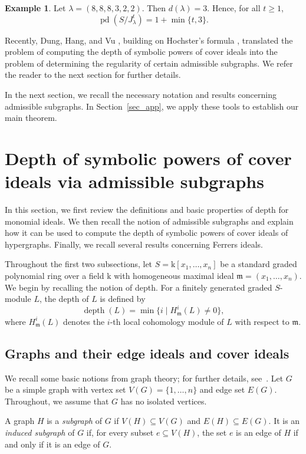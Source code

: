 \documentclass[12pt,amscd]{amsart}
\theoremstyle{definition}
\newtheorem{exam}[thm]{Example}
\numberwithin{equation}{section}
\DeclareMathOperator{\depth}{depth}
\DeclareMathOperator{\pd}{pd}
\def\m {\mathfrak m}
\def\k {\mathrm{k}}
\begin{document}
\begin{exam}
Let $\lambda = (8,8,8,3,2,2)$. Then $d(\lambda)=3$. Hence, for all $t \ge 1$,
\[
\pd(S/J_\lambda^t)=1+\min\{t,3\}.
\]
\end{exam}

Recently, Dung, Hang, and Vu \cite{DHV}, building on Hochster's formula \cite{Hoc}, translated the problem of computing the depth of symbolic powers of cover ideals into the problem of determining the regularity of certain admissible subgraphs. We refer the reader to the next section for further details.

In the next section, we recall the necessary notation and results concerning admissible subgraphs. In Section~\ref{sec_app}, we apply these tools to establish our main theorem.

\section{Depth of symbolic powers of cover ideals via admissible subgraphs}
In this section, we first review the definitions and basic properties of depth for monomial ideals. We then recall the notion of admissible subgraphs and explain how it can be used to compute the depth of symbolic powers of cover ideals of hypergraphs. Finally, we recall several results concerning Ferrers ideals.

Throughout the first two subsections, let
\( S = \k[x_1,\ldots, x_n]
\)
be a standard graded polynomial ring over a field $\k$ with homogeneous maximal ideal
\(
\m = (x_1,\ldots, x_n).
\)
We begin by recalling the notion of depth. For a finitely generated graded $S$-module $L$, the depth of $L$ is defined by
\[
\depth(L) = \min\{i \mid H_{\m}^i(L) \ne 0\},
\]
where $H^{i}_{\m}(L)$ denotes the $i$-th local cohomology module of $L$ with respect to $\m$.



\subsection{Graphs and their edge ideals and cover ideals} We recall some basic notions from graph theory; for further details, see~\cite{Di}. Let $G$ be a simple graph with vertex set $V(G) = \{1, \ldots, n\}$ and edge set $E(G)$. Throughout, we assume that $G$ has no isolated vertices.

A graph $H$ is a \emph{subgraph} of $G$ if $V(H) \subseteq V(G)$ and $E(H) \subseteq E(G)$. It is an \emph{induced subgraph} of $G$ if, for every subset $e \subseteq V(H)$, the set $e$ is an edge of $H$ if and only if it is an edge of $G$.
\end{document}
